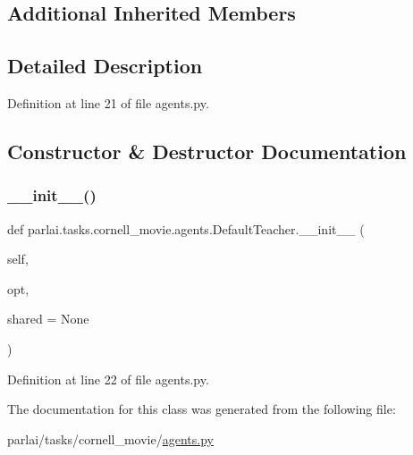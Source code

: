 \subsection*{Additional Inherited Members}


\subsection{Detailed Description}


Definition at line 21 of file agents.\+py.



\subsection{Constructor \& Destructor Documentation}
\mbox{\label{classparlai_1_1tasks_1_1cornell__movie_1_1agents_1_1DefaultTeacher_a0e6994f898313bb5117f56fc4ca78bb7}} 
\subsubsection{\texorpdfstring{\+\_\+\+\_\+init\+\_\+\+\_\+()}{\_\_init\_\_()}}
{\footnotesize\ttfamily def parlai.\+tasks.\+cornell\+\_\+movie.\+agents.\+Default\+Teacher.\+\_\+\+\_\+init\+\_\+\+\_\+ (\begin{DoxyParamCaption}\item[{}]{self,  }\item[{}]{opt,  }\item[{}]{shared = {\ttfamily None} }\end{DoxyParamCaption})}



Definition at line 22 of file agents.\+py.



The documentation for this class was generated from the following file\+:\begin{DoxyCompactItemize}
\item 
parlai/tasks/cornell\+\_\+movie/\hyperlink{parlai_2tasks_2cornell__movie_2agents_8py}{agents.\+py}\end{DoxyCompactItemize}
